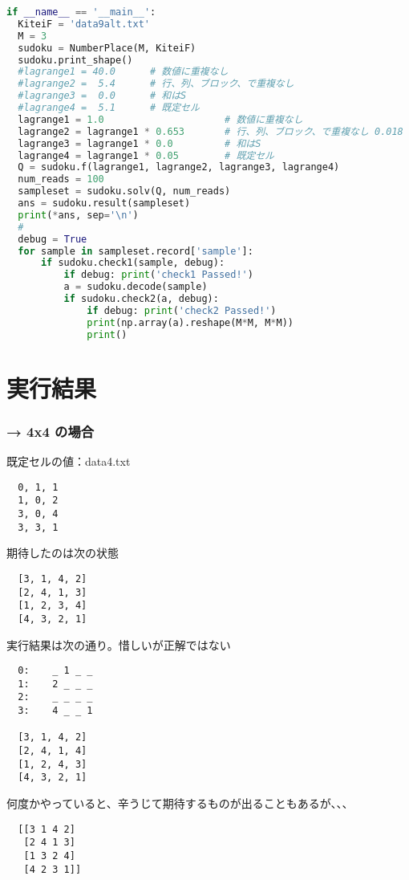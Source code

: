\documentclass[uplatex,dvipdfmx,a4paper,11pt,oneside,openany]{jsbook}
\begin{document}
\begin{lstlisting}[language=Python]
if __name__ == '__main__':
  KiteiF = 'data9alt.txt'
  M = 3
  sudoku = NumberPlace(M, KiteiF)
  sudoku.print_shape()
  #lagrange1 = 40.0      # 数値に重複なし
  #lagrange2 =  5.4      # 行、列、ブロック、で重複なし
  #lagrange3 =  0.0      # 和はS
  #lagrange4 =  5.1      # 既定セル
  lagrange1 = 1.0                     # 数値に重複なし
  lagrange2 = lagrange1 * 0.653       # 行、列、ブロック、で重複なし 0.018
  lagrange3 = lagrange1 * 0.0         # 和はS
  lagrange4 = lagrange1 * 0.05        # 既定セル
  Q = sudoku.f(lagrange1, lagrange2, lagrange3, lagrange4)
  num_reads = 100
  sampleset = sudoku.solv(Q, num_reads)
  ans = sudoku.result(sampleset)
  print(*ans, sep='\n')
  #
  debug = True
  for sample in sampleset.record['sample']:
      if sudoku.check1(sample, debug):
          if debug: print('check1 Passed!')
          a = sudoku.decode(sample)
          if sudoku.check2(a, debug):
              if debug: print('check2 Passed!')
              print(np.array(a).reshape(M*M, M*M))
              print()
\end{lstlisting}


\section{実行結果}

\subsubsection{→ 4x4 の場合}

既定セルの値：data4.txt
\begin{verbatim}
  0, 1, 1
  1, 0, 2
  3, 0, 4
  3, 3, 1
\end{verbatim}

期待したのは次の状態
\begin{verbatim}
  [3, 1, 4, 2]
  [2, 4, 1, 3]
  [1, 2, 3, 4]
  [4, 3, 2, 1]
\end{verbatim}

実行結果は次の通り。惜しいが正解ではない
\begin{verbatim}
  0:	_ 1 _ _
  1:	2 _ _ _
  2:	_ _ _ _
  3:	4 _ _ 1

  [3, 1, 4, 2]
  [2, 4, 1, 4]
  [1, 2, 4, 3]
  [4, 3, 2, 1]
\end{verbatim}

何度かやっていると、辛うじて期待するものが出ることもあるが、、、
\begin{verbatim}
  [[3 1 4 2]
   [2 4 1 3]
   [1 3 2 4]
   [4 2 3 1]]
\end{verbatim}
\end{document}

